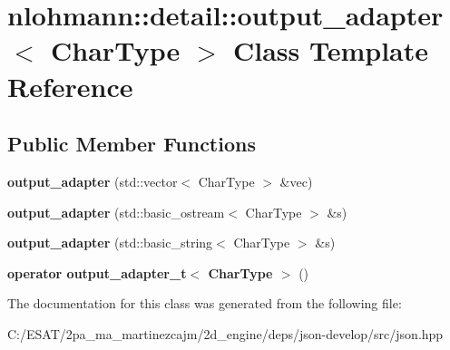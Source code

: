\hypertarget{classnlohmann_1_1detail_1_1output__adapter}{}\section{nlohmann\+:\+:detail\+:\+:output\+\_\+adapter$<$ Char\+Type $>$ Class Template Reference}
\label{classnlohmann_1_1detail_1_1output__adapter}
\subsection*{Public Member Functions}
\begin{DoxyCompactItemize}
\item 
\mbox{\label{classnlohmann_1_1detail_1_1output__adapter_a117bda35bc3de85fd2f5f2153d9705b4}} 
{\bfseries output\+\_\+adapter} (std\+::vector$<$ Char\+Type $>$ \&vec)
\item 
\mbox{\label{classnlohmann_1_1detail_1_1output__adapter_ac086bc101f246eb815e46f17a9e68a4a}} 
{\bfseries output\+\_\+adapter} (std\+::basic\+\_\+ostream$<$ Char\+Type $>$ \&s)
\item 
\mbox{\label{classnlohmann_1_1detail_1_1output__adapter_a07f996a817ffb420022cea56425f7d5c}} 
{\bfseries output\+\_\+adapter} (std\+::basic\+\_\+string$<$ Char\+Type $>$ \&s)
\item 
\mbox{\label{classnlohmann_1_1detail_1_1output__adapter_adee7a0e124f483d9945b8b85c73d7957}} 
{\bfseries operator output\+\_\+adapter\+\_\+t$<$ Char\+Type $>$} ()
\end{DoxyCompactItemize}


The documentation for this class was generated from the following file\+:\begin{DoxyCompactItemize}
\item 
C\+:/\+E\+S\+A\+T/2pa\+\_\+ma\+\_\+martinezcajm/2d\+\_\+engine/deps/json-\/develop/src/json.\+hpp\end{DoxyCompactItemize}
